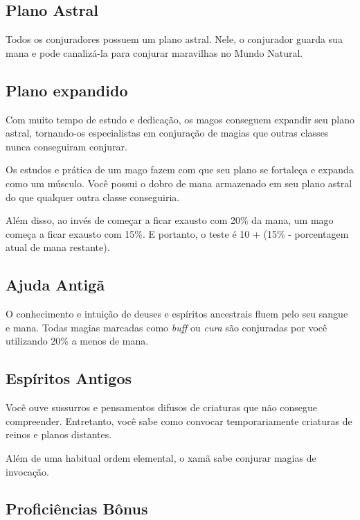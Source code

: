 \begin{multicols}{2}

\section*{Plano Astral}%

Todos os conjuradores possuem um plano astral. Nele, o conjurador guarda sua
mana e pode canalizá-la para conjurar maravilhas no Mundo Natural.

\subsection*{Plano expandido}%

Com muito tempo de estudo e dedicação, os magos conseguem expandir seu plano
astral, tornando-os especialistas em conjuração de magias que outras classes
nunca conseguiram conjurar.

Os estudos e prática de um mago fazem com que seu plano se fortaleça e expanda
como um músculo. Você possui o dobro de mana armazenado em seu plano astral do
que qualquer outra classe conseguiria.

Além disso, ao invés de começar a ficar exausto com 20\% da mana, um mago
começa a ficar exausto com 15\%. E portanto, o teste é 10 + (15\% - porcentagem
atual de mana restante).

\subsection*{Ajuda Antigã}%

O conhecimento e intuição de deuses e espíritos ancestrais fluem pelo seu sangue
e mana. Todas magias marcadas como \textit{buff} ou \textit{cura} são conjuradas
por você utilizando $20\%$ a menos de mana.

\subsection*{Espíritos Antigos}%

Você ouve sussurros e pensamentos difusos de criaturas que não consegue
compreender. Entretanto, você sabe como convocar temporariamente criaturas de
reinos e planos distantes.

Além de uma habitual ordem elemental, o xamã sabe conjurar magias de invocação.

\subsection*{Proficiências Bônus}%


\end{multicols}
